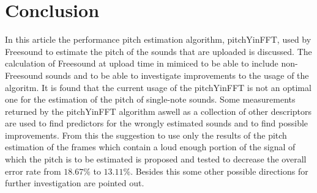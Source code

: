 \documentclass{proc}
\begin{document}
\section{Conclusion}
In this article the performance pitch estimation algorithm, pitchYinFFT, used by Freesound to estimate the pitch of the sounds that are uploaded is discussed. The calculation of Freesound at upload time in mimiced to be able to include non-Freesound sounds and to be able to investigate improvements to the usage of the algoritm. It is found that the current usage of the pitchYinFFT is not an optimal one for the estimation of the pitch of single-note sounds. Some measurements returned by the pitchYinFFT algorithm aswell as a collection of other descriptors are used to find predictors for the wrongly estimated sounds and to find possible improvements. From this the suggestion to use only the results of the pitch estimation of the frames which contain a loud enough portion of the signal of which the pitch is to be estimated is proposed and tested to decrease the overall error rate from $18.67\%$ to $13.11\%$. Besides this some other possible directions for further investigation are pointed out. 

\end{document}
